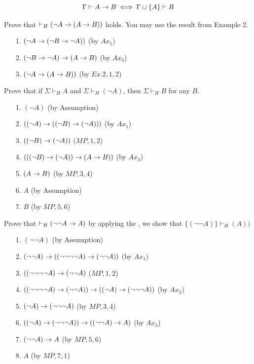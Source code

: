 \documentclass[english, 11pt]{article}
\begin{document}
  \begin{defn}\label{Deduction Theorem}
  \[ \Gamma \vdash A \rightarrow B \iff \Gamma \cup \{ A \} \vdash B \]
  \end{defn}

  \begin{exmp}
    Prove that $\vdash_H ( \neg A \rightarrow ( A \rightarrow B))$ holds. You may use the result from Example 2.
    \begin{itemize}
      \item[1.] $(\neg A \rightarrow ( \neg B \rightarrow \neg A))$ \hfill (by $Ax_1$)
      \item[2.] $(\neg B \rightarrow \neg A) \rightarrow (A \rightarrow B)$ \hfill (by $Ax_3$)
      \item[3.] $(\neg A \rightarrow (A \rightarrow B))$ \hfill (by $Ex.2,1,2$)
    \end{itemize}
  \end{exmp}

  \begin{exmp}
    Prove that if $\Sigma \vdash_H A$ and $\Sigma \vdash_H ( \neg A)$, then $\Sigma \vdash_H B$ for any $B$.
    \begin{itemize}
      \item[1.] $(\neg A)$ \hfill (by Assumption)
      \item[2.] $((\neg A) \rightarrow ((\neg B) \rightarrow (\neg A)))$ \hfill (by $Ax_1$)
      \item[3.] $((\neg B) \rightarrow (\neg A))$ \hfill ($MP,1,2$)
      \item[4.] $(((\neg B) \rightarrow (\neg A)) \rightarrow (A \rightarrow B))$ \hfill (by $Ax_3$)
      \item[5.] $(A \rightarrow B)$ \hfill (by $MP,3,4$)
      \item[6.] $A$ \hfill (by Assumption)
      \item[7.] $B$ \hfill (by $MP,5,6$)
    \end{itemize}
  \end{exmp}

  \begin{exmp}
    Prove that $\vdash_H(\neg \neg A \rightarrow A)$ by applying the , we show that $\{(\neg \neg A) \} \vdash_H (A))$
    \begin{itemize}
      \item[1.] $(\neg \neg A)$ \hfill (by Assumption)
      \item[2.] $(\neg \neg A) \rightarrow ((\neg \neg \neg \neg A) \rightarrow (\neg \neg A))$ \hfill (by $Ax_1$)
      \item[3.] $((\neg \neg \neg \neg A) \rightarrow (\neg \neg A)$ \hfill ($MP,1,2$)
      \item[4.] $((\neg \neg \neg \neg A) \rightarrow (\neg \neg A)) \rightarrow (( \neg A) \rightarrow (\neg \neg \neg A))$ \hfill (by $Ax_3$)
      \item[5.] $(\neg A) \rightarrow (\neg \neg \neg A)$ \hfill (by $MP,3,4$)
      \item[6.] $((\neg A) \rightarrow (\neg \neg \neg A)) \rightarrow (( \neg \neg A) \rightarrow A)$ \hfill (by $Ax_3$)
      \item[7.] $(\neg \neg A) \rightarrow A$ \hfill (by $MP,5,6$)
      \item[8.] $A$ \hfill (by $MP,7,1$)
    \end{itemize}
  \end{exmp}
\end{document}
